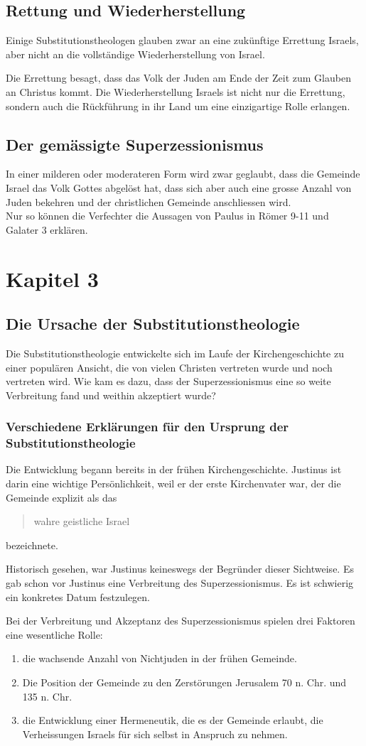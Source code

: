 \documentclass{../../inc/mybib}
\newcommand{\st}{Substitutionstheolog}
\newcommand{\sz}{Superzessionismus}
\begin{document}
    \subsection{Rettung und Wiederherstellung}
    Einige \st en glauben zwar an eine zukünftige Errettung Israels, aber nicht an die vollständige Wiederherstellung von Israel.

    Die Errettung besagt, dass das Volk der Juden am Ende der Zeit zum Glauben an Christus kommt.
    Die Wiederherstellung Israels ist nicht nur die Errettung, sondern auch die Rückführung in ihr Land um eine einzigartige Rolle erlangen.
    \subsection{Der gemässigte \sz}
    In einer milderen oder moderateren Form wird zwar geglaubt, dass die Gemeinde Israel das Volk Gottes abgelöst hat, dass sich aber auch eine grosse Anzahl von Juden bekehren und der christlichen Gemeinde anschliessen wird.\\
    Nur so können die Verfechter die Aussagen von Paulus in Römer 9-11 und Galater 3 erklären.
    \section{Kapitel 3}
    \subsection{Die Ursache der \st ie}
    Die \st ie entwickelte sich im Laufe der Kirchengeschichte zu einer populären Ansicht, die von vielen Christen vertreten wurde und noch vertreten wird. Wie kam es dazu, dass der \sz{} eine so weite Verbreitung fand und weithin akzeptiert wurde?
    \subsubsection{Verschiedene Erklärungen für den Ursprung der \st ie}
    Die Entwicklung begann bereits in der frühen Kirchengeschichte. Justinus ist darin eine wichtige Persönlichkeit, weil er der erste Kirchenvater war, der die Gemeinde explizit als das \blockquote{wahre geistliche Israel} bezeichnete.

    Historisch gesehen, war Justinus keineswegs der Begründer dieser Sichtweise. Es gab schon vor Justinus eine Verbreitung des \sz. Es ist schwierig ein konkretes Datum festzulegen.

    Bei der Verbreitung und Akzeptanz des \sz{} spielen drei Faktoren eine wesentliche Rolle:
    \begin{enumerate}
        \item die wachsende Anzahl von Nichtjuden in der frühen Gemeinde.
        \item Die Position der Gemeinde zu den Zerstörungen Jerusalem 70 n. Chr. und 135 n. Chr.
        \item die Entwicklung einer Hermeneutik, die es der Gemeinde erlaubt, die Verheissungen Israels für sich selbst in Anspruch zu nehmen.
    \end{enumerate}
\end{document}
